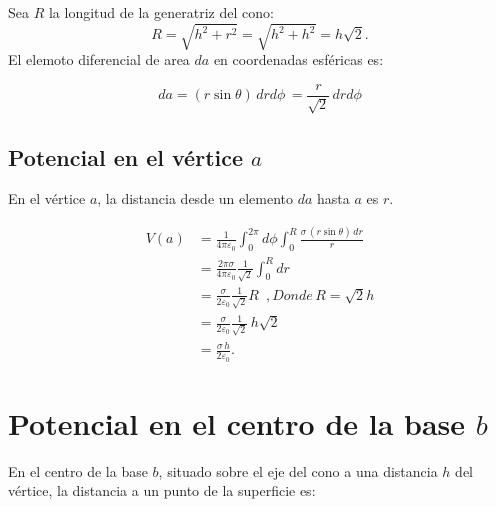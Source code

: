 \documentclass[12pt,letterpaper]{article}
\begin{document}
Sea $R$ la longitud de la generatriz del cono:
\[
  R=\sqrt{h^2+r^2}=\sqrt{h^2+h^2}=h\sqrt{2}.
\]
El elemoto diferencial de area $da$ en coordenadas esféricas es:

\[
  da = (r\sin\theta)\,drd\phi\, = \frac{r}{\sqrt{2}}\,drd\phi
\]
\subsection*{Potencial en el vértice $a$}
En el vértice $a$, la distancia desde un elemento $da$ hasta $a$ es $r$.

\begin{align*}
  V(a) &=\frac{1}{4\pi\varepsilon_0}\int_{0}^{2\pi}d\phi\int_{0}^{R}\frac{\sigma\,(r\sin\theta)\,dr}{r}\\
     &=\frac{2\pi\sigma}{4\pi\varepsilon_0} \frac{1}{\sqrt2}\int_{0}^{R}dr\\
     &=\frac{\sigma}{2\varepsilon_0}\frac{1}{\sqrt2}R\, \,\, ,Donde \, R=\sqrt2h\\
     &=\frac{\sigma}{2\varepsilon_0}\frac{1}{\sqrt2}\,h\sqrt2\\
     &=\frac{\sigma\,h}{2\varepsilon_0}.
\end{align*}

\section*{Potencial en el centro de la base $b$}
En el centro de la base $b$, situado sobre el eje del cono a una distancia $h$ del vértice, la distancia a un punto de la superficie es:
\end{document}
